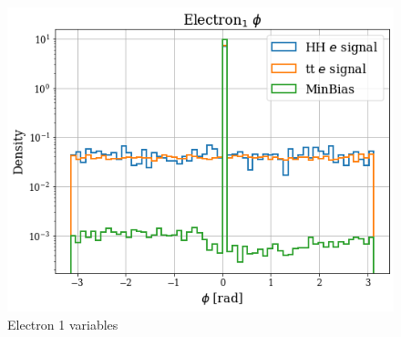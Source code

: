 \documentclass[../main.tex]{subfiles}
\begin{document}
\begin{figure}[!ht]
\begin{minipage}[b]{0.33\linewidth}
    \centering
    \includegraphics[width=1\linewidth]{Chapters/Plots/Hist_1ele_electron1_Phi.png}
  \end{minipage}
  \caption{Electron 1 variables}
 \end{figure}
 
\end{document}
